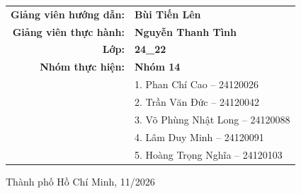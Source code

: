 \begin{titlepage}
\begin{center}
    \vspace{1cm}

    \begin{flushright}
        \begin{tabular}{r l}
            \textbf{Giảng viên hướng dẫn:} & \textbf{Bùi Tiến Lên} \\
            \textbf{Giảng viên thực hành:} & \textbf{Nguyễn Thanh Tình} \\
            \textbf{Lớp:} & \textbf{24\_22} \\
            \textbf{Nhóm thực hiện:} & \textbf{Nhóm 14} \\
            & 1. Phan Chí Cao -- 24120026 \\
            & 2. Trần Văn Đức -- 24120042 \\
            & 3. Võ Phùng Nhật Long -- 24120088 \\
            & 4. Lâm Duy Minh -- 24120091 \\
            & 5. Hoàng Trọng Nghĩa -- 24120103 \\
        \end{tabular}
    \end{flushright}

    \vfill
    {\footnotesize Thành phố Hồ Chí Minh, 11/2026}

    \vspace{-2cm}

\end{center}
\end{titlepage}
